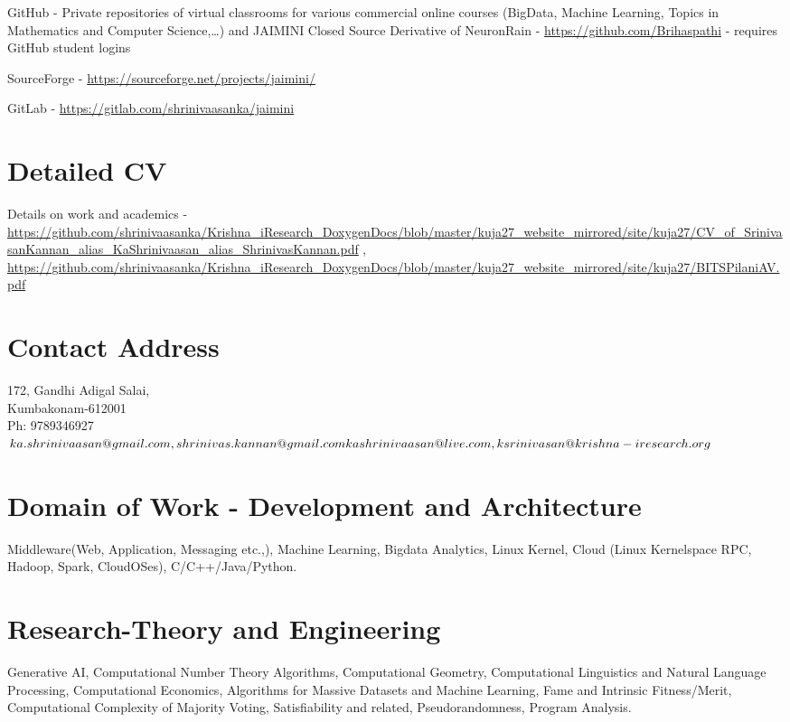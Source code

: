 \documentclass[11pt,onecolumn]{article}
\begin{document}
GitHub - Private repositories of virtual classrooms for various commercial online courses (BigData, Machine Learning, Topics in Mathematics and Computer Science,…) and JAIMINI Closed Source Derivative of NeuronRain - \url {https://github.com/Brihaspathi} - requires GitHub student logins

SourceForge - \url {https://sourceforge.net/projects/jaimini/}

GitLab - \url {https://gitlab.com/shrinivaasanka/jaimini}

\section{Detailed CV}
Details on work and academics - \url {https://github.com/shrinivaasanka/Krishna_iResearch_DoxygenDocs/blob/master/kuja27_website_mirrored/site/kuja27/CV\_of\_SrinivasanKannan\_alias\_KaShrinivaasan\_alias\_ShrinivasKannan.pdf} , \url {https://github.com/shrinivaasanka/Krishna_iResearch_DoxygenDocs/blob/master/kuja27_website_mirrored/site/kuja27/BITSPilaniAV.pdf}

\section{Contact Address}
172, Gandhi Adigal Salai, \\
Kumbakonam-612001 \\
Ph: 9789346927 \\
$ka.shrinivaasan@gmail.com, shrinivas.kannan@gmail.com \\ kashrinivaasan@live.com, ksrinivasan@krishna-iresearch.org$ 

\section{Domain of Work - Development and Architecture}
Middleware(Web, Application, Messaging etc.,), Machine Learning, Bigdata Analytics, Linux Kernel, Cloud (Linux Kernelspace RPC, Hadoop, Spark, CloudOSes), C/C++/Java/Python.

\section{Research-Theory and Engineering}
Generative AI, Computational Number Theory Algorithms, Computational Geometry, Computational Linguistics and Natural Language Processing, Computational Economics, Algorithms for Massive Datasets and Machine Learning, Fame and Intrinsic Fitness/Merit, Computational Complexity of Majority Voting, Satisfiability and related, Pseudorandomness, Program Analysis.
\end{document}
